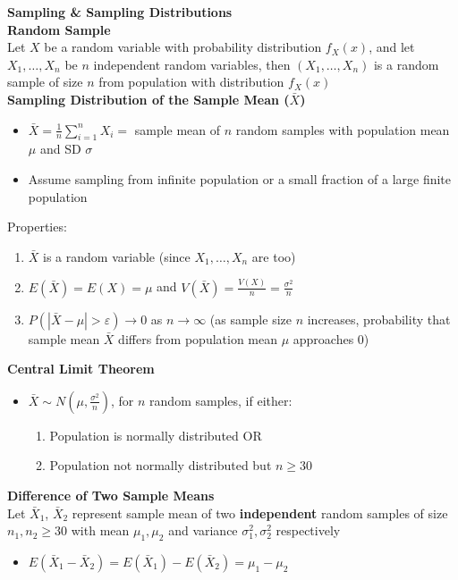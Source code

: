 \documentclass[a4paper, 12pt]{article}
\begin{document}
\begin{multicols*}{4}
\medskip

{\small\textbf{Sampling \& Sampling Distributions}} \\
\textbf{Random Sample} \\
Let $X$ be a random variable with probability distribution $f_X(x)$, and let $X_1,\dots,X_n$ be $n$ independent random variables, then $(X_1,\dots,X_n)$ is a random sample of size $n$ from population with distribution $f_X(x)$ \\
\textbf{Sampling Distribution of the Sample Mean ($\bar{X}$)}
\begin{itemize}
    \item $\bar{X} = \frac{1}{n}\sum^n_{i=1}X_i =$ sample mean of $n$ random samples with population mean $\mu$ and SD $\sigma$
    \item Assume sampling from infinite population or a small fraction of a large finite population
\end{itemize}
Properties:
\begin{enumerate}
    \item $\bar{X}$ is a random variable (since $X_1, \dots, X_n$ are too)
    \item $E(\bar{X}) = E(X) = \mu$ and $V(\bar{X})=\frac{V(X)}{n}=\frac{\sigma^2}{n}$
    \item $P(|\bar{X}-\mu|>\varepsilon) \rightarrow 0$ as $n \rightarrow \infty$ (as sample size $n$ increases, probability that sample mean $\bar{X}$ differs from population mean $\mu$ approaches 0)
\end{enumerate}
\textbf{Central Limit Theorem}
\begin{itemize}
    \item $\bar{X} \sim N(\mu,\frac{\sigma^2}{n})$, for $n$ random samples, if either:
    \begin{enumerate}
        \item Population is normally distributed OR
        \item Population not normally distributed but $n\geq 30$
    \end{enumerate}
\end{itemize}
\textbf{Difference of Two Sample Means} \\
Let $\bar{X}_1$, $\bar{X}_2$ represent sample mean of two \textbf{independent} random samples of size $n_1, n_2 \geq 30$ with mean $\mu_1, \mu_2$ and variance $\sigma_1^2, \sigma_2^2$ respectively 
\begin{itemize}
    \item $E(\bar{X}_1-\bar{X}_2) = E(\bar{X}_1)-E(\bar{X}_2) = \mu_1-\mu_2$

\end{itemize}
\end{multicols*}
\end{document}
